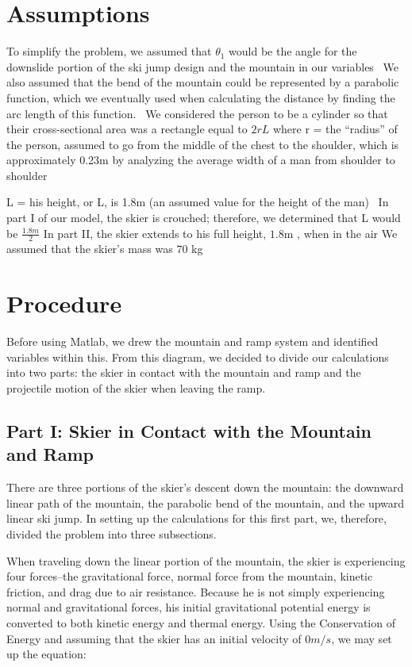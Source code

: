 \documentclass[]{IEEEphot}
\begin{document}
 \section{Assumptions}
 To simplify the problem, we assumed that $\theta_1$ would be the angle for the downslide portion of the ski jump design and the mountain in our variables
\
 We also assumed that the bend of the mountain could be represented by a parabolic function, which we eventually used when calculating the distance by finding the arc length of this function.
\
 We considered the person to be a cylinder so that their cross-sectional area was a rectangle equal to $2rL$
 where
 	r = the ``radius'' of the person, assumed to go from the middle of the chest to the shoulder, which is approximately 0.23m by analyzing the average width of a man from shoulder to shoulder

	L = his height, or L, is 1.8m (an assumed value for the height of the man)
\
In part I of our model, the skier is crouched; therefore, we determined that L would be $\frac{1.8m}{2}$
In part II, the skier extends to his full height, $1.8$m , when in the air
We assumed that the skier’s mass was $70$ kg



\section{Procedure}

Before using Matlab, we drew the mountain and ramp system and identified variables within this. From this diagram, we decided to divide our calculations into two parts: the skier in contact with the mountain and ramp and the projectile motion of the skier when leaving the ramp.

\subsection{Part I: Skier in Contact with the Mountain and Ramp}

There are three portions of the skier’s descent down the mountain: the downward linear path of the mountain, the parabolic bend of the mountain, and the upward linear ski jump. In setting up the calculations for this first part, we, therefore, divided the problem into three subsections.

When traveling down the linear portion of the mountain, the skier is experiencing four forces--the gravitational force, normal force from the mountain, kinetic friction, and drag due to air resistance. Because he is not simply experiencing normal and gravitational forces, his initial gravitational potential energy is converted to both kinetic energy and thermal energy. Using the Conservation of Energy and assuming that the skier has an initial velocity of $0 m/s$, we may set up the equation:
\end{document}

